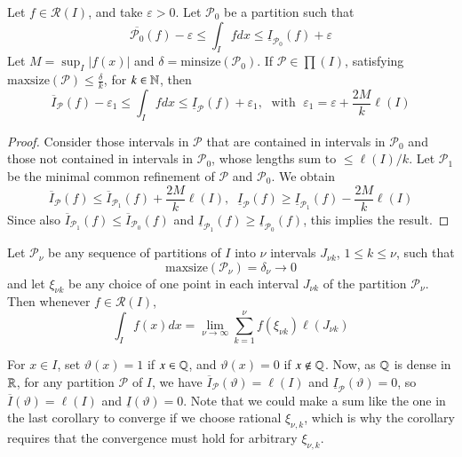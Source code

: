 \begin{prop}
    Let $f \in \mathcal{R}(I)$, and take $\varepsilon > 0$. Let $\mathcal{P}_0$ be a partition such that $$\overline{\mathcal{P}_0}(f) - \varepsilon \leq \int_Ifdx \leq \underline{I}_{\mathcal{P}_0}(f) + \varepsilon$$ Let $M = \sup_I|f(x)|$ and $\delta = \text{minsize}(\mathcal{P}_0)$. If $\mathcal{P} \in \prod(I)$, satisfying $\text{maxsize}(\mathcal{P}) \leq \frac{\delta}{k}$, for $k \in \mathbb N$, then $$\overline{I}_{\mathcal{P}}(f) - \varepsilon_1 \leq \int_Ifdx \leq \underline{I}_{\mathcal{P}}(f) + \varepsilon_1,\;\text{ with }\;\varepsilon_1 = \varepsilon + \frac{2M}{k}\ell(I)$$
\end{prop}
\begin{proof}
    Consider those intervals in $\mathcal{P}$ that are contained in intervals in $\mathcal{P}_0$ and those not contained in intervals in $\mathcal{P}_0$, whose lengths sum to $\leq \ell(I)/k$. Let $\mathcal{P}_1$ be the minimal common refinement of $\mathcal{P}$ and $\mathcal{P}_0$. We obtain \begin{equation*}
        \overline{I}_{\mathcal{P}}(f) \leq \overline{I}_{\mathcal{P}_1}(f) +\frac{2M}{k}\ell(I),\;\;\underline{I}_{\mathcal{P}}(f) \geq \underline{I}_{\mathcal{P}_1}(f) - \frac{2M}{k}\ell(I)
    \end{equation*}
    Since also $\overline{I}_{\mathcal{P}_1}(f) \leq \overline{I}_{\mathcal{P}_0}(f)$ and $\underline{I}_{\mathcal{P}_1}(f) \geq \underline{I}_{\mathcal{P}_0}(f)$, this implies the result.
\end{proof}

\begin{cor}
    Let $\mathcal{P}_\nu$ be any sequence of partitions of $I$ into $\nu$ intervals $J_{\nu k}$, $1 \leq k \leq \nu$, such that $$\text{maxsize}(\mathcal{P}_\nu) = \delta_\nu\rightarrow 0$$
    and let $\xi_{\nu k}$ be any choice of one point in each interval $J_{\nu k}$ of the partition $\mathcal{P}_\nu$. Then whenever $f \in \mathcal{R}(I)$, $$\int_If(x)dx = \lim\limits_{\nu\rightarrow \infty}\sum_{k=1}^\nu f(\xi_{\nu k})\ell(J_{\nu k})$$
\end{cor}

\begin{eg}
    For $x \in I$, set $\vartheta(x) = 1$ if $x \in \mathbb Q$, and $\vartheta(x) = 0$ if $x \notin \mathbb Q$. Now, as $\mathbb Q$ is dense in $\mathbb R$, for any partition $\mathcal{P}$ of $I$, we have $\overline{I}_{\mathcal{P}}(\vartheta) = \ell(I)$ and $\underline{I}_{\mathcal{P}}(\vartheta) = 0$, so $\overline{I}(\vartheta) = \ell(I)$ and $\underline{I}(\vartheta) = 0$. Note that we could make a sum like the one in the last corollary to converge if we choose rational $\xi_{\nu,k}$, which is why the corollary requires that the convergence must hold for arbitrary $\xi_{\nu,k}$.
\end{eg}

